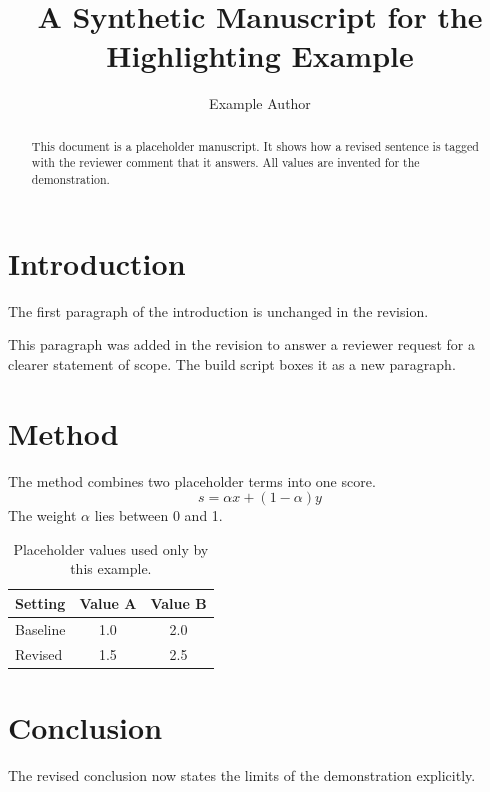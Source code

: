 \documentclass[11pt]{article}
\title{A Synthetic Manuscript for the Highlighting Example}
\author{Example Author}
\date{}
\begin{document}
\maketitle

\begin{abstract}
This document is a placeholder manuscript. It shows how a revised sentence is tagged with the reviewer comment that it answers. All values are invented for the demonstration.
\end{abstract}

\section{Introduction}
The first paragraph of the introduction is unchanged in the revision.

This paragraph was added in the revision to answer a reviewer request for a clearer statement of scope. The build script boxes it as a new paragraph.

\section{Method}
The method combines two placeholder terms into one score.
\begin{equation}
  s = \alpha x + (1-\alpha) y
  \label{eq:score}
\end{equation}
The weight $\alpha$ lies between 0 and 1.

\begin{table}[ht]
  \centering
  \caption{Placeholder values used only by this example.}
  \label{tab:values}
  \begin{tabular}{lcc}
    \toprule
    Setting & Value A & Value B \\
    \midrule
    Baseline & 1.0 & 2.0 \\
    Revised & 1.5 & 2.5 \\
    \bottomrule
  \end{tabular}
\end{table}

\section{Conclusion}
The revised conclusion now states the limits of the demonstration explicitly.
\end{document}
